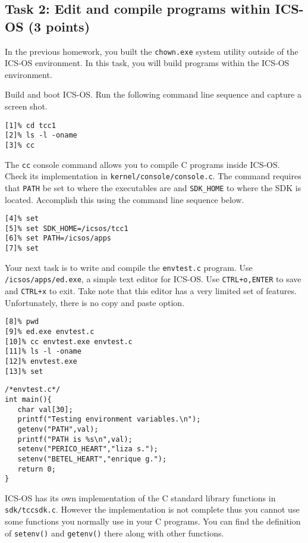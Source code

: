 \documentclass[a4paper, 11pt,oneside]{article}
\begin{document}
\subsection*{Task 2: Edit and compile programs within ICS-OS (3 points)}
In the previous homework, you built the \texttt{chown.exe} system utility outside 
of the ICS-OS environment. In this task, you will build programs within the 
ICS-OS environment.

Build and boot ICS-OS. Run the following command line sequence and capture a screen shot.	

\begin{verbatim}
[1]% cd tcc1
[2]% ls -l -oname
[3]% cc
\end{verbatim}

The \texttt{cc} console command allows you to compile C programs inside ICS-OS. Check its implementation 
in \texttt{kernel/console/console.c}. The command requires that \texttt{PATH} be set to where 
the executables are and \texttt{SDK\_HOME} to where the SDK is located. Accomplish this using the command line sequence below.  

\begin{verbatim}
[4]% set
[5]% set SDK_HOME=/icsos/tcc1
[6]% set PATH=/icsos/apps
[7]% set
\end{verbatim}

Your next task is to write and compile the \texttt{envtest.c} program. Use \texttt{/icsos/apps/ed.exe}, a simple text editor for ICS-OS. Use \texttt{CTRL+o,ENTER} to save and \texttt{CTRL+x} to exit. Take note that this editor has a very limited set of features. Unfortunately, there is no copy and paste option.

\begin{verbatim}
[8]% pwd
[9]% ed.exe envtest.c  
[10]% cc envtest.exe envtest.c
[11]% ls -l -oname
[12]% envtest.exe
[13]% set
\end{verbatim}

\begin{verbatim}
/*envtest.c*/
int main(){
   char val[30];
   printf("Testing environment variables.\n");
   getenv("PATH",val);
   printf("PATH is %s\n",val);
   setenv("PERICO_HEART","liza s.");
   setenv("BETEL_HEART","enrique g.");
   return 0;
}
\end{verbatim}

ICS-OS has its own implementation of the C standard library functions in \texttt{sdk/tccsdk.c}.
However the implementation is not complete thus you cannot use some functions you normally 
use in your C programs.
You can find the definition of \texttt{setenv()} and \texttt{getenv()} there along with other functions. 
\end{document}
